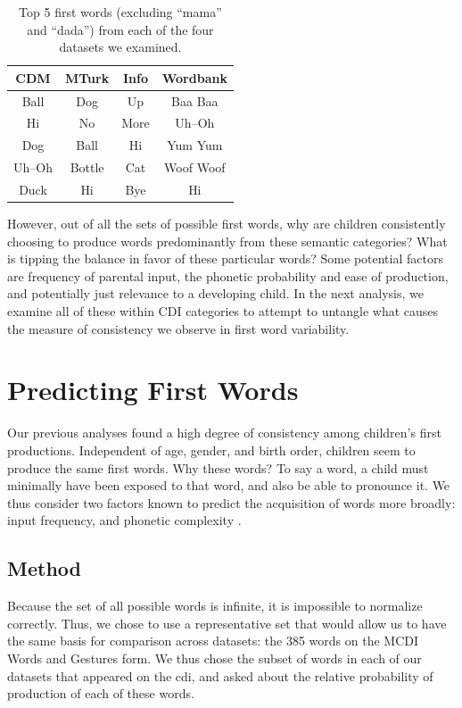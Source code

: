 \documentclass[10pt,letterpaper]{article}
\begin{document}

\begin{table}[t]
\centering
\begin{tabular}{cccc}
\hline
{\bf CDM} & {\bf MTurk} & {\bf Info} & {\bf Wordbank} \\ 
\hline
Ball & Dog & Up & Baa Baa \\ 
Hi & No & More & Uh--Oh \\
Dog & Ball & Hi & Yum Yum \\ 
Uh--Oh & Bottle & Cat & Woof Woof \\ 
Duck & Hi & Bye & Hi \\ 
\hline 
\end{tabular}
\caption{\label{tab:top5} Top 5 first words (excluding ``mama'' and ``dada'') from each of the four datasets we examined.}
\end{table}

However, out of all the sets of possible first words, why are children consistently choosing to produce words predominantly from these semantic categories? What is tipping the balance in favor of these particular words? Some potential factors are frequency of parental input, the phonetic probability and ease of production, and potentially just relevance to a developing child. In the next analysis, we examine all of these within CDI categories to attempt to untangle what causes the measure of consistency we observe in first word variability.


\section{Predicting First Words}

Our previous analyses found a high degree of consistency among children's first productions. Independent of age, gender, and birth order, children seem to produce the same first words. Why these words? To say a word, a child must minimally have been exposed to that word, and also be able to pronounce it. We thus consider two factors known to predict the acquisition of words more broadly: input frequency, and phonetic complexity \cite{goodman2008}.

\subsection{Method}

Because the set of all possible words is infinite, it is impossible to normalize correctly. Thus, we chose to use a representative set that would allow us to have the same basis for comparison across datasets: the 385 words on the MCDI Words and Gestures form. We thus chose the subset of words in each of our datasets that appeared on the cdi, and asked about the relative probability of production of each of these words.
\end{document}
